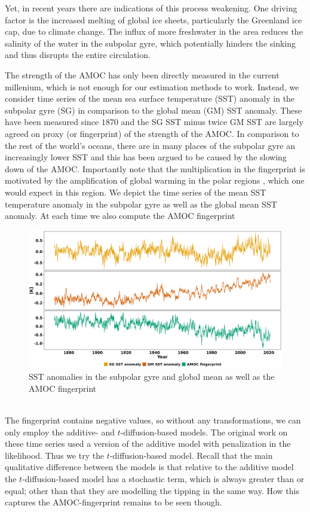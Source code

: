 Yet, in recent years there are indications of this process weakening. One driving factor is the increased melting of global ice sheets, particularly the Greenland ice cap, due to climate change. The influx of more freshwater in the area reduces the salinity of the water in the subpolar gyre, which potentially hinders the sinking and thus disrupts the entire circulation. 

The strength of the AMOC has only been directly measured in the current millenium, which is not enough for our estimation methods to work. Instead, we consider time series of the mean sea surface temperature (SST) anomaly in the subpolar gyre (SG) in comparison to the global mean (GM) SST anomaly. These have been measured since $1870$ and the SG SST minus twice GM SST are largely agreed on proxy (or fingerprint) of the strength of the AMOC. In comparison to the rest of the world's oceans, there are in many places of the subpolar gyre an increasingly lower SST and this has been argued to be caused by the slowing down of the AMOC. Importantly note that the multiplication in the fingerprint is motivated by the amplification of global warming in the polar regions \cite[caption of Figure 1]{Ditlevsen2023}, which one would expect in this region.
\noindent We depict the time series of the mean SST temperature anomaly in the subpolar gyre as well as the global mean SST anomaly. At each time we also compute the AMOC fingerprint
\begin{figure}[h!]
    \begin{center}
    \includegraphics[scale = .06]{figures/AMOC_data_plot.jpeg}
    \caption{SST anomalies in the subpolar gyre and global mean as well as the AMOC fingerprint}
    \label{figure:AMOC_plot}
    \end{center}
\end{figure}\\
The fingerprint contains negative values, so without any transformations, we can only employ the additive- and $t$-diffusion-based models. The original work on these time series \cite{Ditlevsen2023} used a version of the additive model with penalization in the likelihood. Thus we try the $t$-diffusion-based model. Recall that the main qualitative difference between the models is that relative to the additive model the $t$-diffusion-based model has a stochastic term, which is always greater than or equal; other than that they are modelling the tipping in the same way. How this captures the AMOC-fingerprint remains to be seen though.
